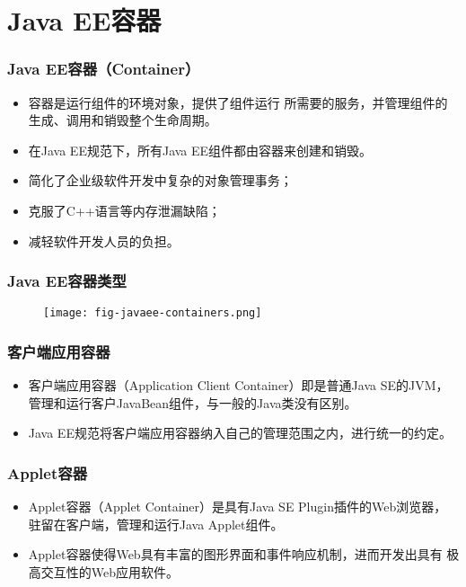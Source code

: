 \section{Java EE容器}

\begin{frame}
  \frametitle{Java EE容器（Container）} 

  
  \begin{itemize}
  \item {\hei\Blue 容器}是运行{\hei\Red 组件}的环境对象，提供了组件运行
    所需要的服务，并管理组件的生成、调用和销毁整个生命周期。
  \item 在Java EE规范下，所有Java EE组件都由容器来创建和销毁。
  \end{itemize}

  
  \begin{itemize}
  \item 简化了企业级软件开发中复杂的对象管理事务；
  \item 克服了C++语言等内存泄漏缺陷；
  \item 减轻软件开发人员的负担。
  \end{itemize}
\end{frame}

\begin{frame}
  \frametitle{Java EE容器类型} 
  \begin{figure}
    \centering
    \texttt{[image: fig-javaee-containers.png]}
  \end{figure}
\end{frame}

\begin{frame}
  \frametitle{ 客户端应用容器} 

  \begin{itemize}
  \item 客户端应用容器（Application Client Container）即是普通Java
    SE的JVM，管理和运行客户JavaBean组件，与一般的Java类没有区别。
  \item Java EE规范将客户端应用容器纳入自己的管理范围之内，进行统一的约定。
  \end{itemize}
\end{frame}

\begin{frame}
\frametitle{ Applet容器} 
\begin{itemize}
\item Applet容器（Applet Container）是具有Java SE Plugin插件的Web浏览器，
  驻留在客户端，管理和运行Java Applet组件。
\item Applet容器使得Web具有丰富的图形界面和事件响应机制，进而开发出具有
  极高交互性的Web应用软件。
\end{itemize}
\end{frame}

